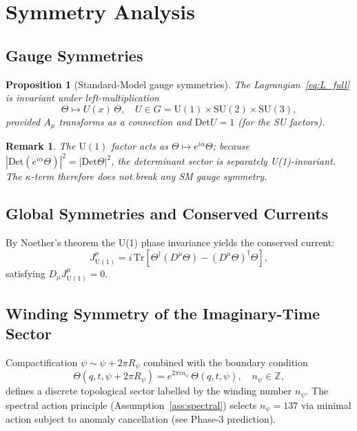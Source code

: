 \documentclass[12pt]{article}
\newtheorem{proposition}{Proposition}[section]
\newtheorem{remark}{Remark}[section]
\newcommand{\Z}{\mathbb{Z}}
\newcommand{\Tr}{\mathrm{Tr}}
\newcommand{\Det}{\mathrm{Det}}
\begin{document}
\section{Symmetry Analysis}

\subsection{Gauge Symmetries}

\begin{proposition}[Standard-Model gauge symmetries]
\label{prop:SM_gauge}
The Lagrangian~\eqref{eq:L_full} is invariant under left-multiplication
\[
  \Theta\mapsto U(x)\,\Theta, \quad U\in G = \mathrm{U}(1)\times\mathrm{SU}(2)\times\mathrm{SU}(3),
\]
provided $A_\mu$ transforms as a connection and $\Det U = 1$ (for the SU factors).
\end{proposition}

\begin{remark}
The $\mathrm{U}(1)$ factor acts as $\Theta\mapsto e^{i\alpha}\Theta$; because
$|\Det(e^{i\alpha}\Theta)|^2 = |\Det\Theta|^2$, the determinant sector is separately
U(1)-invariant. The $\kappa$-term therefore does not break any SM gauge symmetry.
\end{remark}

\subsection{Global Symmetries and Conserved Currents}

By Noether's theorem the U(1) phase invariance yields the conserved current:
\begin{equation}
  J^\mu_{\mathrm{U}(1)}
  = i\,\Tr\!\left[\Theta^\dagger(D^\mu\Theta) - (D^\mu\Theta)^\dagger\Theta\right],
  \label{eq:U1_current}
\end{equation}
satisfying $D_\mu J^\mu_{\mathrm{U}(1)} = 0$.

\subsection{Winding Symmetry of the Imaginary-Time Sector}

Compactification $\psi\sim\psi+2\pi R_\psi$ combined with the boundary condition
\[
  \Theta(q,t,\psi+2\pi R_\psi) = e^{2\pi i n_\psi}\,\Theta(q,t,\psi), \quad n_\psi\in\Z,
\]
defines a discrete topological sector labelled by the winding number $n_\psi$.  The
spectral action principle (Assumption~\ref{ass:spectral}) selects $n_\psi=137$ via
minimal action subject to anomaly cancellation (see Phase-3 prediction).
\end{document}
